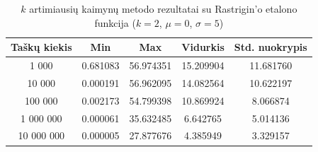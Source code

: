 \begin{table}[H]
    \centering
    \begin{tabular}{|c|c|c|c|c|}
        \hline
        \textbf{Taškų kiekis} & \textbf{Min} & \textbf{Max} & \textbf{Vidurkis} & \textbf{Std. nuokrypis} \\ \hline
        1 000        & 0.681083 & 56.974351 & 15.209904 & 11.681760 \\ \hline
        10 000       & 0.000191 & 56.962095 & 14.082564 & 10.622197 \\ \hline
        100 000      & 0.002173 & 54.799398 & 10.869924 & 8.066874 \\ \hline
        1 000 000    & 0.000061 & 35.632485 & 6.642765 & 5.014136 \\ \hline
        10 000 000   & 0.000005 & 27.877676 & 4.385949 & 3.329157 \\ \hline
    \end{tabular}
    \caption{$k$ artimiausių kaimynų metodo rezultatai su Rastrigin'o etalono funkcija ($k = 2$, $\mu = 0$, $\sigma = 5$)}
\end{table}